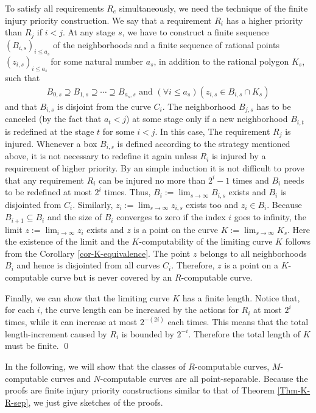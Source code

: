 \documentclass{LMCS}
\theoremstyle{plain}
\begin{document}
To satisfy all requirements $R_e$ simultaneously, we need the technique of the finite injury priority construction. We say that a requirement $R_i$ has a higher priority than $R_j$ if $i <j$. At any stage $s$, we have to construct a finite sequence $(B_{i,s})_{i \le a_s}$ of the neighborhoods and a finite sequence of rational points $(z_{i,s})_{i\le a_s}$ for some natural number $a_s$, in addition to the rational polygon $K_s$,  such that
\begin{eqnarray*}
B_{0,s} \supseteq B_{1,s} \supseteq \cdots \supseteq B_{a_s, s} \mbox{ and } (\forall i \le a_s)( z_{i,s} \in B_{i,s} \cap K_s)
\end{eqnarray*}
and that $B_{i,s}$ is disjoint from the curve $C_i$. The neighborhood $B_{j,s}$ has to be canceled (by the fact that $a_t < j$) at some stage only if a new neighborhood $B_{i,t}$ is redefined at the stage $t$ for some $i<j$. In this case, The requirement $R_j$ is injured.  Whenever a box $B_{i,s}$ is defined according to the strategy mentioned above, it is not necessary to redefine it again unless $R_i$ is injured by a requirement of higher priority. By an simple induction it is not difficult to prove that any requirement $R_i$ can be injured no more than $2^i-1$ times and $B_i$ needs to be redefined at most $2^i$ times. Thus, $B_i := \lim_{s\to\infty} B_{i,s}$ exists and $B_i$ is disjointed from $C_i$. Similarly, $z_i := \lim_{s\to\infty} z_{i,s}$ exists too and $z_i \in B_i$.  Because $B_{i+1} \subseteq B_i$ and the size of $B_i$ converges to zero if the index $i$ goes to infinity, the limit $z:=\lim_{i\to\infty} z_i$ exists and $z$ is a point on the curve $K:= \lim_{s\to\infty} K_s$. Here the existence of the limit and the $K$-computability of the limiting curve $K$ follows from the Corollary \ref{cor-K-equivalence}. The point $z$ belongs to all neighborhoods $B_i$ and hence is disjointed from all curves $C_i$. Therefore, $z$ is a point on a $K$-computable curve but is never covered by an $R$-computable curve.

Finally, we can show that the limiting curve $K$ has a finite length. Notice that, for each $i$, the curve length can be increased by the actions for $R_i$ at most $2^i$ times, while it can increase at most $2^{-(2i)}$ each times. This means that the total length-increment caused by $R_i$ is bounded by $2^{-i}$. Therefore the total length of $K$ must be finite.
\qed

In the following, we will show that the classes of $R$-computable curves, $M$-computable curves and $N$-computable curves are all point-separable. Because the proofs are finite injury priority constructions similar to that of Theorem \ref{Thm-K-R-sep}, we just give sketches of the proofs.
\end{document}
